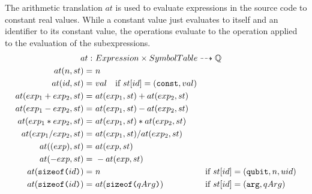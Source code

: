 The arithmetic translation $at$ is used to evaluate expressions in the source code to constant real values. While a constant value just evaluates to itself and an identifier to its constant value, the operations evaluate to the operation applied to the evaluation of the subexpressions.
\begin{align*}
    at : \ & \rlap{$Expression \times SymbolTable \dashrightarrow \mathbb{Q}$} &&\\
    at(n, st) = \ & n && \\
    at(id, st) = \ & val \quad \text{if } st[id] = (\texttt{const}, val)&& \\
    at(exp_1 + exp_2, st) = \ & at(exp_1, st) + at(exp_2, st)&& \\
    at(exp_1 - exp_2, st) = \ & at(exp_1, st) - at(exp_2, st)&& \\
    at(exp_1 * exp_2, st) = \ & at(exp_1, st) * at(exp_2, st)&& \\
    at(exp_1 / exp_2, st) = \ & at(exp_1, st) / at(exp_2, st)&& \\
    at((exp), st) = \ & at(exp, st)&& \\
    at(-exp, st) = \ & -at(exp, st)&& \\
    at(\texttt{sizeof(} id \texttt{)}) = \ & n && \text{if } st[id] = (\texttt{qubit}, n, uid)\\
    at(\texttt{sizeof(} id \texttt{)}) = \ & at(\texttt{sizeof(} qArg \texttt{)}) && \text{if } st[id] = (\texttt{arg}, qArg)
\end{align*}

